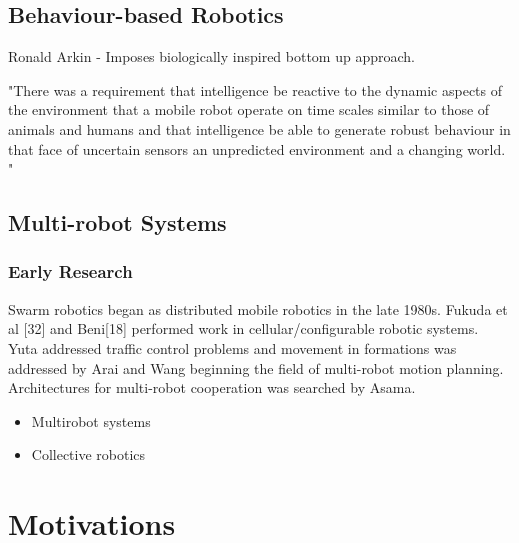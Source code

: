 \subsection{Behaviour-based Robotics}
\label{behaviourbasedrobotics}

Ronald Arkin - Imposes biologically inspired bottom up approach. 

"There was a requirement that intelligence be reactive to the dynamic aspects of the environment that a mobile robot operate on time scales similar to those of animals and humans and that intelligence be able to generate robust behaviour in that face of uncertain sensors an unpredicted environment and a changing world. "

\subsection{Multi-robot Systems}
\label{multi-robot systems}



\subsubsection{Early Research}
\label{early-research}

Swarm robotics began as distributed mobile robotics in the late 1980s. Fukuda et al [32] and Beni[18] performed work in cellular/configurable robotic systems. Yuta addressed traffic control problems and movement in formations was addressed by Arai and Wang beginning the field of multi-robot motion planning. Architectures for multi-robot cooperation 
was searched by Asama.








\begin{itemize}
\item Multirobot systems
\item Collective robotics
\end{itemize}

\section{Motivations}
\label{sec:first:advantages}


